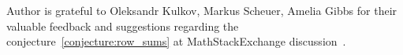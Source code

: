 ﻿Author is grateful to Oleksandr Kulkov, Markus Scheuer, Amelia Gibbs for their valuable feedback and suggestions
regarding the conjecture~\eqref{conjecture:row_sums} at MathStackExchange discussion~\cite{kolosov2024iterated}.
